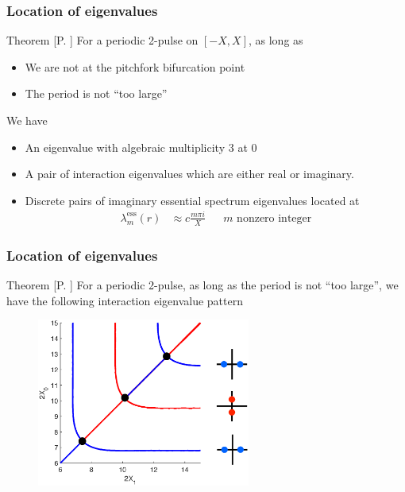 \documentclass[16pt]{beamer}
\begin{document}
\begin{frame}
\frametitle{Location of eigenvalues} 
	\fontsize{14}{7.2}\selectfont
    \begin{block}{Theorem [P. ]}
    For a periodic 2-pulse on $[-X, X]$, as long as
    \begin{itemize}
    	\item We are not at the pitchfork bifurcation point
    	\item The period is not ``too large''
    \end{itemize}
    We have
    \begin{itemize}
    	\item An eigenvalue with algebraic multiplicity 3 at 0
    	\item A pair of interaction eigenvalues which are either real or imaginary.
    	\item Discrete pairs of imaginary essential spectrum eigenvalues located at
    	\begin{align*}
    	\lambda_m^{\text{ess}}(r) &\approx c \frac{m \pi i}{X} && m \text{ nonzero integer}
    	\end{align*}
    \end{itemize}
    \end{block}
\end{frame}

\begin{frame}
\frametitle{Location of eigenvalues} 
	\fontsize{14}{7.2}\selectfont
    \begin{block}{Theorem [P. ]}
    For a periodic 2-pulse, as long as the period is not ``too large'', we have the following interaction eigenvalue pattern
    	\begin{figure}
		\begin{center}
		\includegraphics[width=7cm]{images/2periodiceigpattern.eps}
		\end{center}
		\end{figure}
    \end{block}
\end{frame}
\end{document}
